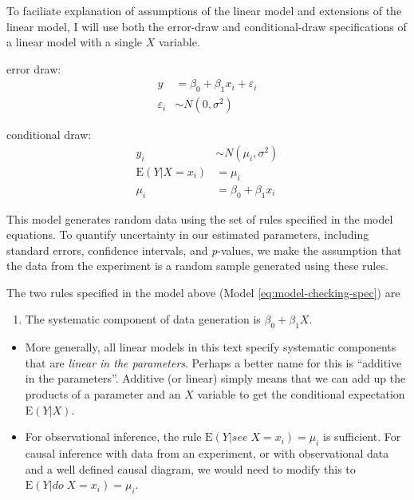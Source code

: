 \documentclass[]{book}
\providecommand{\tightlist}{%
  \setlength{\itemsep}{0pt}\setlength{\parskip}{0pt}}
\begin{document}
To faciliate explanation of assumptions of the linear model and extensions of the linear model, I will use both the error-draw and conditional-draw specifications of a linear model with a single \(X\) variable.

error draw:
\begin{align}
y &= \beta_0 + \beta_1 x_i + \varepsilon_i\\
\varepsilon_i &\sim N(0, \sigma^2)
\label{eq:model-checking-spec1}
\end{align}

conditional draw:
\begin{align}
y_i &\sim N(\mu_i, \sigma^2)\\
\mathrm{E}(Y|X=x_i) &= \mu_i\\
\mu_i &= \beta_0 + \beta_1 x_i
\label{eq:model-checking-spec2}
\end{align}

This model generates random data using the set of rules specified in the model equations. To quantify uncertainty in our estimated parameters, including standard errors, confidence intervals, and \emph{p}-values, we make the assumption that the data from the experiment is a random sample generated using these rules.

The two rules specified in the model above (Model \eqref{eq:model-checking-spec}) are

\begin{enumerate}
\def\labelenumi{\arabic{enumi}.}
\tightlist
\item
  The systematic component of data generation is \(\beta_0 + \beta_1 X\).
\end{enumerate}

\begin{itemize}
\tightlist
\item
  More generally, all linear models in this text specify systematic components that are \emph{linear in the parameters}. Perhaps a better name for this is ``additive in the parameters''. Additive (or linear) simply means that we can add up the products of a parameter and an \(X\) variable to get the conditional expectation \(\mathrm{E}(Y|X)\).
\item
  For observational inference, the rule \(\mathrm{E}(Y| see\;X=x_i) = \mu_i\) is sufficient. For causal inference with data from an experiment, or with observational data and a well defined causal diagram, we would need to modify this to \(\mathrm{E}(Y|do\; X=x_i) = \mu_i\).
\end{itemize}
\end{document}

